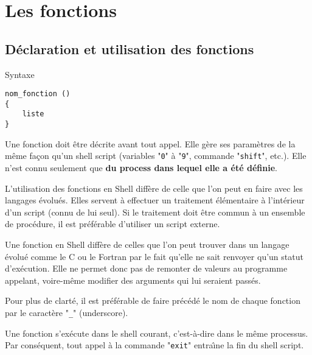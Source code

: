 \section{\label{sh-functions}Les fonctions}

\subsection{D{\'e}claration et utilisation des fonctions}

\begin{definition}{Syntaxe}
\begin{verbatim}
nom_fonction ()
{
    liste
}
\end{verbatim}
\end{definition}

Une fonction doit {\^e}tre d{\'e}crite avant tout appel. Elle g{\`e}re ses param{\`e}tres de la m{\^e}me fa\c{c}on qu'un
shell script (variables "\texttt{0}" {\`a} "\texttt{9}", commande "\texttt{shift}", etc.).
Elle n{'}est connu seulement que {\bf du process dans lequel elle a {\'e}t{\'e} d{\'e}finie}.

L{'}utilisation des fonctions en Shell diff{\`e}re de celle que l{'}on peut en faire avec les langages {\'e}volu{\'e}s.
Elles servent {\`a} effectuer un traitement {\'e}l{\'e}mentaire {\`a} l{'}int{\'e}rieur d{'}un script (connu de lui seul). Si le
traitement doit {\^e}tre commun {\`a} un ensemble de proc{\'e}dure, il est pr{\'e}f{\'e}rable d{'}utiliser un script
externe.

Une fonction en Shell diff{\`e}re de celles que l'on peut trouver dans un langage {\'e}volu{\'e} comme
le C ou le Fortran par le fait qu'elle ne sait renvoyer qu'un statut d'ex{\'e}cution. Elle
ne permet donc  pas de remonter de valeurs au programme appelant, voire-m{\^e}me
modifier des arguments qui lui seraient pass{\'e}s.

\begin{remarque}
Pour plus de clart{\'e}, il est pr{\'e}f{\'e}rable de faire pr{\'e}c{\'e}d{\'e} le nom de chaque fonction par le
caract{\`e}re "\texttt{\_}" (underscore).
\end{remarque}

Une fonction s'ex{\'e}cute dans le shell courant,  c{'}est-{\`a}-dire dans le m{\^e}me processus. Par
cons{\'e}quent, tout appel {\`a} la commande "\texttt{exit}" entra{\^\i}ne la fin du shell script.

